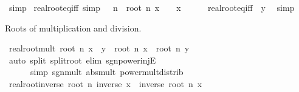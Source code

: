 \begin{isabellebody}
\ simp%
\endisatagproof
{\isafoldproof}%
%
\isadelimproof
\isanewline
%
\endisadelimproof
\isanewline
{}\isamarkupfalse%
\ real{\isacharunderscore}{\kern0pt}root{\isacharunderscore}{\kern0pt}eq{\isacharunderscore}{\kern0pt}{}{\isacharunderscore}{\kern0pt}iff\ {\isacharbrackleft}{\kern0pt}simp{\isacharbrackright}{\kern0pt}{\isacharcolon}{\kern0pt}\ {\isachardoublequoteopen}{}\ {\isacharless}{\kern0pt}\ n\ {\isasymLongrightarrow}\ root\ n\ x\ {\isacharequal}{\kern0pt}\ {}\ {\isasymlongleftrightarrow}\ x\ {\isacharequal}{\kern0pt}\ {}{\isachardoublequoteclose}\isanewline
%
\isadelimproof
\ \ %
\endisadelimproof
%
\isatagproof
{}\isamarkupfalse%
\ real{\isacharunderscore}{\kern0pt}root{\isacharunderscore}{\kern0pt}eq{\isacharunderscore}{\kern0pt}iff\ {\isacharbrackleft}{\kern0pt}\ y{\isacharequal}{\kern0pt}{}{\isacharbrackright}{\kern0pt}\ \isamarkupfalse%
\ simp%
\endisatagproof
{\isafoldproof}%
%
\isadelimproof
%
\endisadelimproof
%
\begin{isamarkuptext}%
Roots of multiplication and division.%
\end{isamarkuptext}\isamarkuptrue%
\isamarkupfalse%
\ real{\isacharunderscore}{\kern0pt}root{\isacharunderscore}{\kern0pt}mult{\isacharcolon}{\kern0pt}\ {\isachardoublequoteopen}root\ n\ {\isacharparenleft}{\kern0pt}x\ {\isacharasterisk}{\kern0pt}\ y{\isacharparenright}{\kern0pt}\ {\isacharequal}{\kern0pt}\ root\ n\ x\ {\isacharasterisk}{\kern0pt}\ root\ n\ y{\isachardoublequoteclose}\isanewline
%
\isadelimproof
\ \ %
\endisadelimproof
%
\isatagproof
{}\isamarkupfalse%
\ {\isacharparenleft}{\kern0pt}auto\ split{\isacharcolon}{\kern0pt}\ split{\isacharunderscore}{\kern0pt}root\ elim{\isacharbang}{\kern0pt}{\isacharcolon}{\kern0pt}\ sgn{\isacharunderscore}{\kern0pt}power{\isacharunderscore}{\kern0pt}injE\isanewline
\ \ \ \ \ \ simp{\isacharcolon}{\kern0pt}\ sgn{\isacharunderscore}{\kern0pt}mult\ abs{\isacharunderscore}{\kern0pt}mult\ power{\isacharunderscore}{\kern0pt}mult{\isacharunderscore}{\kern0pt}distrib{\isacharparenright}{\kern0pt}%
\endisatagproof
{\isafoldproof}%
%
\isadelimproof
\isanewline
%
\endisadelimproof
\isanewline
{}\isamarkupfalse%
\ real{\isacharunderscore}{\kern0pt}root{\isacharunderscore}{\kern0pt}inverse{\isacharcolon}{\kern0pt}\ {\isachardoublequoteopen}root\ n\ {\isacharparenleft}{\kern0pt}inverse\ x{\isacharparenright}{\kern0pt}\ {\isacharequal}{\kern0pt}\ inverse\ {\isacharparenleft}{\kern0pt}root\ n\ x{\isacharparenright}{\kern0pt}{\isachardoublequoteclose}\isanewline

\end{isabellebody}
